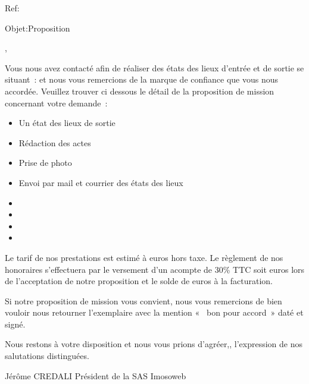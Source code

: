 \documentclass{article}
\begin{document}
\begin{raggedleft}
Ref:\idDevis
\end{raggedleft}

\begin{flushright}
\dateemissionDevis
\end{flushright}

\begin{raggedleft}
Objet:Proposition \objet
\end{raggedleft}

\begin{center}
\civilite, 
\end{center}

\vspace { 1cm }
Vous nous avez contacté afin de réaliser des états des lieux d’entrée et de sortie se situant : \adressebien et nous vous remercions de la marque de confiance que vous nous accordée.
Veuillez trouver ci dessous  le détail de la proposition de mission concernant votre demande :
\begin{itemize}
\item \missionA Un état des lieux de sortie
\item \missionB Rédaction des actes
\item \missionC Prise de photo
\item \missionD Envoi par mail et courrier des états des lieux
\item \missionE
\item \missionF
\item \missionG
\item \missionH
\end{itemize}

\vspace { 0.5cm }
Le tarif de nos prestations est estimé à \prixht euros hors taxe.
Le règlement de nos honoraires s’effectuera par le versement d’un acompte de  30\% TTC soit \acompte euros lors de l’acceptation de notre proposition et le solde de \prixmaoinsacompte euros à la facturation.

\vspace { 0.5cm }
Si notre proposition de mission vous convient, nous vous remercions de bien vouloir nous retourner l’exemplaire avec la mention «  bon pour accord » daté et signé.

 \vspace { 0.5cm }
Nous restons à votre disposition et nous vous prions d’agréer,\civilite, l’expression de nos salutations distinguées.
\vspace { 2cm }
                                                                                            
                                            				       Jérôme CREDALI
\newline
                                                                                     Président de la SAS Imosoweb
\end{document}
